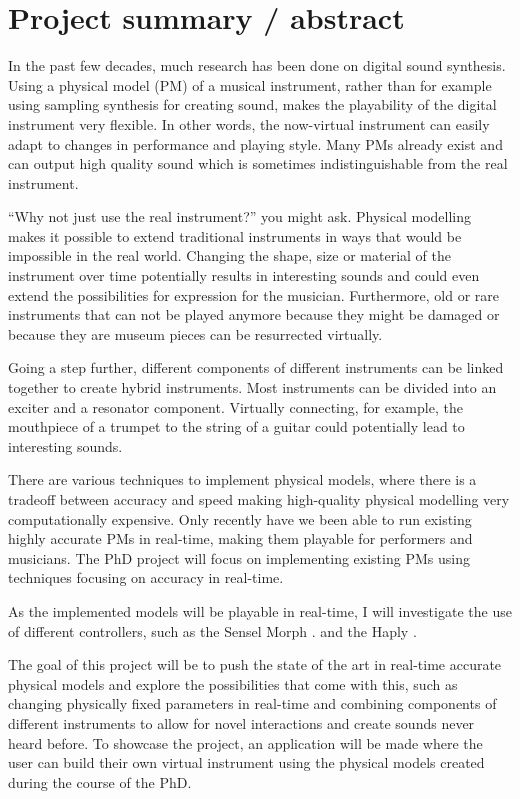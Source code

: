 \section{Project summary / abstract}

In the past few decades, much research has been done on digital sound synthesis. Using a physical model (PM) of a musical instrument, rather than for example using sampling synthesis for creating sound, makes the playability of the digital instrument very flexible. In other words, the now-virtual instrument can easily adapt to changes in performance and playing style. Many PMs already exist and can output high quality sound which is sometimes indistinguishable from the real instrument.

“Why not just use the real instrument?” you might ask. Physical modelling makes it possible to extend traditional instruments in ways that would be impossible in the real world. Changing the shape, size or material of the instrument over time potentially results in interesting sounds and could even extend the possibilities for expression for the musician. Furthermore, old or rare instruments that can not be played anymore because they might be damaged or because they are museum pieces can be resurrected virtually.

Going a step further, different components of different instruments can be linked together to create hybrid instruments. Most instruments can be divided into an exciter and a resonator component. Virtually connecting, for example, the mouthpiece of a trumpet to the string of a guitar could potentially lead to interesting sounds.

There are various techniques to implement physical models, where there is a tradeoff between accuracy and speed making high-quality physical modelling very computationally expensive. Only recently have we been able to run existing highly accurate PMs in real-time, making them playable for performers and musicians. The PhD project will focus on implementing existing PMs using techniques focusing on accuracy in real-time.

As the implemented models will be playable in real-time, I will investigate the use of different controllers, such as the Sensel Morph \cite{Sensel2019}. and the Haply \cite{Haply2019}.

The goal of this project will be to push the state of the art in real-time accurate physical models and explore the possibilities that come with this, such as changing physically fixed parameters in real-time and combining components of different instruments to allow for novel interactions and create sounds never heard before. To showcase the project, an application will be made where the user can build their own virtual instrument using the physical models created during the course of the PhD. 

